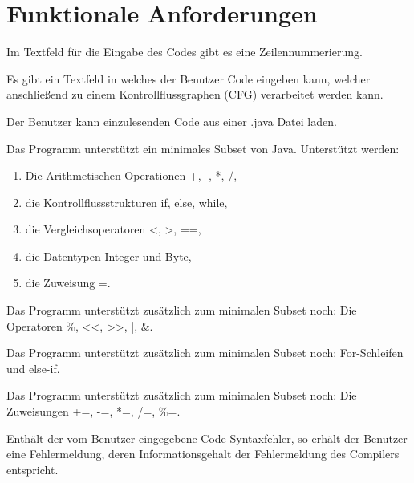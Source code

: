 
\section{Funktionale Anforderungen}

Im Textfeld für die Eingabe des Codes gibt es eine Zeilennummerierung.

Es gibt ein Textfeld in welches der Benutzer Code eingeben kann, welcher anschließend zu einem Kontrollflussgraphen (CFG) verarbeitet werden kann.

Der Benutzer kann einzulesenden Code aus einer .java Datei laden.

Das Programm unterstützt ein minimales Subset von Java.
Unterstützt werden:
\begin{enumerate}[label=(\alph*)]
\item Die Arithmetischen Operationen +, -, *, /,
\item die Kontrollflussstrukturen if, else, while,
\item die Vergleichsoperatoren <, >, ==,
\item die Datentypen Integer und Byte,
\item die Zuweisung =.
\end{enumerate}

Das Programm unterstützt zusätzlich zum minimalen Subset noch:
Die Operatoren \%, <<, >>, |, \&.

Das Programm unterstützt zusätzlich zum minimalen Subset noch:
For-Schleifen und else-if.

Das Programm unterstützt zusätzlich zum minimalen Subset noch:
Die Zuweisungen +=, -=, *=, /=, \%=.

Enthält der vom Benutzer eingegebene Code Syntaxfehler, so erhält der Benutzer eine Fehlermeldung, deren Informationsgehalt der Fehlermeldung des Compilers entspricht.

